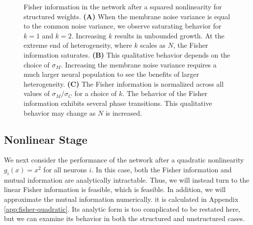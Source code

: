 \documentclass[11pt]{article}
\begin{document}
\begin{figure}[t]
	\centering
	\caption{Fisher information in the network after a squared nonlinearity for structured weights. \textbf{(A)} When the membrane noise variance is equal to the common noise variance, we observe saturating behavior for $k=1$ and $k=2$. Increasing $k$ results in unbounded growth. At the extreme end of heterogeneity, where $k$ scales as $N$, the Fisher information saturates. \textbf{(B)} This qualitative behavior depends on the choice of $\sigma_M$. Increasing the membrane noise variance requires a much larger neural population to see the benefits of larger heterogeneity. \textbf{(C)} The Fisher information is normalized across all values of $\sigma_M/\sigma_C$ for a choice of $k$. The behavior of the Fisher information exhibits several phase transitions. This qualitative behavior may change as $N$ is increased.}
	\label{fig:fisher-quadratic}
\end{figure}
	
	
	\subsection{Nonlinear Stage}
	We next consider the performance of the network after a quadratic nonlinearity $g_i(x) = x^2$ for all neurons $i$. In this case, both the Fisher information and mutual information are analytically intractable. Thus, we will instead turn to the linear Fisher information is feasible, which is feasible. In addition, we will approximate the mutual information numerically. it is calculated in Appendix \ref{app:fisher-quadratic}. Its analytic form is too complicated to be restated here, but we can examine its behavior in both the structured and unstructured cases.
	
\end{document}
